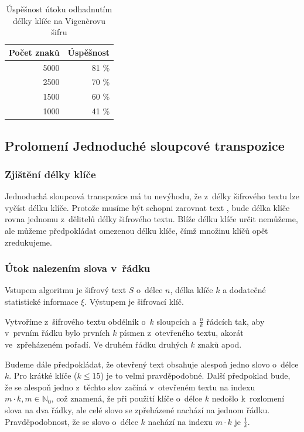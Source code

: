 \documentclass[12pt]{article}
\theoremstyle{definition}
\newcommand{\stats}{\xi}
\begin{document}
\begin{table}[ht]
  \begin{center}
    \begin{tabular}{|r|r|}
    \hline
    Počet znaků&Úspěšnost\\
    \hline
    5000&81 \%\\
    2500&70 \%\\
    1500&60 \%\\
    1000&41 \%\\
    \hline
    \end{tabular}
    \caption{Úspěšnost útoku odhadnutím délky klíče na Vigenèrovu šifru} 
    \label{tabvigkey}
  \end{center}
\end{table}




\subsection{Prolomení Jednoduché sloupcové transpozice}
\subsubsection{Zjištění délky klíče}
\label{keylengthtrans}
Jednoduchá sloupcová transpozice má tu nevýhodu, že z~délky šifrového textu lze vyčíst délku klíče. Protože musíme být schopni zarovnat text , bude délka klíče rovna jednomu z~dělitelů délky šifrového textu. Blíže délku klíče určit nemůžeme, ale můžeme předpokládat omezenou délku klíče, čímž množinu klíčů opět zredukujeme. 

\subsubsection{Útok nalezením slova v~řádku}
\label{searchwords}
Vstupem algoritmu je šifrový text $S$ o~délce $n$, délka klíče $k$ a dodatečné statistické informace $\stats$. Výstupem je šifrovací klíč. 

Vytvoříme z~šifrového textu obdélník o~$k$ sloupcích a $\frac{n}{k}$ řádcích tak, aby v~prvním řádku bylo prvních $k$ písmen z~otevřeného textu, akorát ve~zpřeházeném pořadí. Ve druhém řádku druhých $k$ znaků apod. 

Budeme dále předpokládat, že otevřený text obsahuje alespoň jedno slovo o~délce $k$. Pro krátké klíče ($k\le15$) je to velmi pravděpodobné. Další předpoklad bude, že se alespoň jedno z~těchto slov začíná v~otevřeném textu na indexu $m\cdot k, m \in \mathbb{N}_0$, což znamená, že při použití klíče o~délce $k$ nedošlo k~rozlomení slova na dva řádky, ale celé slovo se zpřeházené nachází na jednom řádku. Pravděpodobnost, že se slovo o~délce $k$ nachází na indexu $m\cdot k$ je $\frac{1}{k}$.
\end{document}
